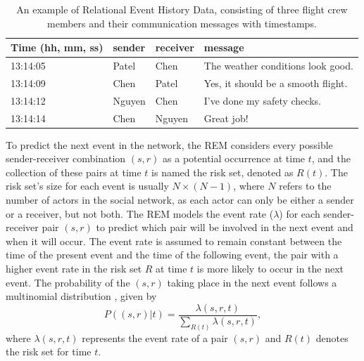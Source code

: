 \documentclass[]{interact}
\theoremstyle{plain}%
\theoremstyle{definition}
\theoremstyle{remark}
\begin{document}
	\begin{table}[H]
		\centering
		\renewcommand{\arraystretch}{1.1} %
		\small
		\caption{An example of Relational Event History Data, consisting of three flight crew members and their communication messages with timestamps.}
		\begin{tabular}{llll}
			\hline
			Time (hh,  mm, ss) & sender & receiver & message                                  \\ \hline
			13:14:05           & Patel  & Chen     & The weather conditions look good.        \\
			13:14:09           & Chen   & Patel    & Yes, it should be a smooth flight.       \\
			13:14:12           & Nguyen & Chen     & I've done my safety checks.              \\
			13:14:14           & Chen   & Nguyen   & Great job!                               \\ \hline
		\end{tabular}
		\label{Table 1}
	\end{table}
	
	To predict the next event in the network, the REM considers every possible sender-receiver combination $(s,r)$ as a potential occurrence at time $t$, and the collection of these pairs at time $t$ is named the risk set, denoted as $R(t)$. The risk set's size for each event is usually $N \times (N-1)$, where $N$ refers to the number of actors in the social network, as each actor can only be either a sender or a receiver, but not both. The REM models the event rate ($\lambda$) for each sender-receiver pair $(s,r)$ to predict which pair will be involved in the next event and when it will occur. The event rate is assumed to remain constant between the time of the present event and the time of the following event, the pair with a higher event rate in the risk set $R$ at time $t$ is more likely to occur in the next event. The probability of the $(s,r)$ taking place in the next event follows a multinomial distribution \cite{buttsRelationalEventFramework2008}, given by
	\begin{equation} \label{1}
		P \left((s,r) | t \right) = \dfrac{\lambda(s,r,t)} {\sum_{R(t)} \lambda(s,r,t)},
	\end{equation}
	where $\lambda(s,r,t)$ represents the event rate of a pair $(s,r)$ and $R(t)$ denotes the risk set for time $t$. \\
	
\end{document}
